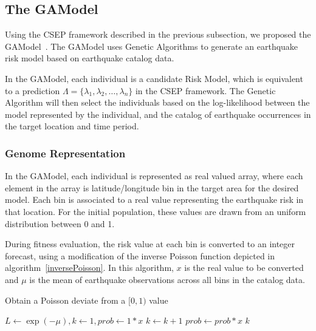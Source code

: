 \subsection{The GAModel}\label{sec:background:gamodel}

Using the CSEP framework described in the previous subsection, we
proposed the GAModel~\cite{ecta14}. The GAModel uses Genetic
Algorithms to generate an earthquake risk model based on earthquake
catalog data.

In the GAModel, each individual is a candidate Risk Model, which is
equivalent to a prediction $\Lambda = \{\lambda_1, \lambda_2, \ldots,
\lambda_n\}$ in the CSEP framework. The Genetic Algorithm will then
select the individuals based on the log-likelihood between the model
represented by the individual, and the catalog of earthquake
occurrences in the target location and time period.

\subsubsection*{Genome Representation}

In the GAModel, each individual is represented as real valued array,
where each element in the array is latitude/longitude bin in the
target area for the desired model. Each bin is associated to a real
value representing the earthquake risk in that location. For the
initial population, these values are drawn from an uniform
distribution between 0 and 1.


During fitness evaluation, the risk value at each bin is converted to
an integer forecast, using a modification of the inverse Poisson
function depicted in algorithm~\ref{inversePoisson}. In this algorithm,
$x$ is the real value to be converted and $\mu$ is the mean of
earthquake observations across all bins in the catalog data.

\begin{algorithm}[H]\label{inversePoisson}
  \caption{Obtain a Poisson deviate from a $[0,1)$ value}
    \label{inversePoisson}
    \begin{algorithmic}
      \STATE $L \gets \exp{(-\mu)}, k \gets 1, prob \gets 1 * x$
      \STATE $k \gets k + 1$
      \STATE $prob \gets prob*x$
      \ENDWHILE
      \RETURN $k$
    \end{algorithmic}
\end{algorithm}

